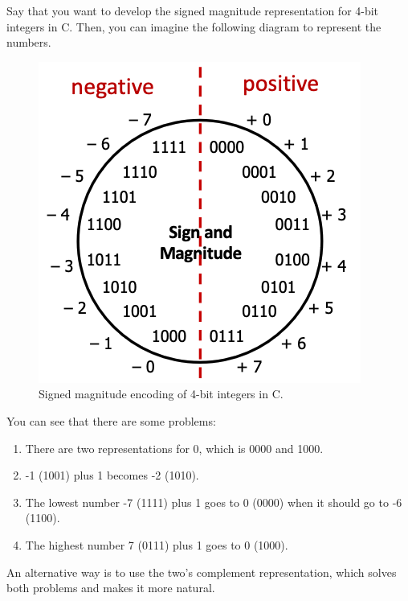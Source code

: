 \documentclass{article}
\begin{document}
    \begin{example}
      Say that you want to develop the signed magnitude representation for 4-bit integers in C. Then, you can imagine the following diagram to represent the numbers. 
      \begin{figure}[H]
        \centering 
        \includegraphics[scale=0.4]{img/signed_magnitude_encoding.png}
        \caption{Signed magnitude encoding of 4-bit integers in C.} 
        \label{fig:signed_magnitude_encoding}
      \end{figure}
      You can see that there are some problems: 
      \begin{enumerate}
        \item There are two representations for $0$, which is 0000 and 1000. 
        \item -1 (1001) plus 1 becomes -2 (1010). 
        \item The lowest number -7 (1111) plus 1 goes to 0 (0000) when it should go to -6 (1100). 
        \item The highest number 7 (0111) plus 1 goes to 0 (1000). 
      \end{enumerate}
    \end{example}

    An alternative way is to use the two's complement representation, which solves both problems and makes it more natural. 
\end{document}

